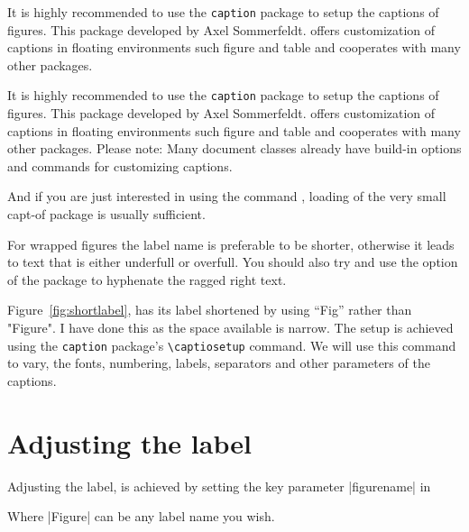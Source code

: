 It is highly recommended to use the \texttt{caption} package to setup the captions of figures. This package developed by Axel Sommerfeldt. offers customization of captions in floating environments such
figure and table and cooperates with many other packages.

It is highly recommended to use the \texttt{caption} package to setup the captions of figures. This package developed by Axel Sommerfeldt. offers customization of captions in floating environments such
figure and table and cooperates with many other packages.
Please note: Many document classes already have build-in options and commands
for customizing captions.

And if you are just interested in using the
command , loading of the very small capt-of package is usually sufficient.

For wrapped figures the label name is preferable to be shorter, otherwise it leads to text that is either underfull or overfull. You should also try and use the  option of the  package to hyphenate the ragged right text.



Figure~\ref{fig:shortlabel}, has its label shortened by using ``Fig'' rather than "Figure". I have done this as the space available is narrow. The setup is achieved using the \texttt{caption} package's \verb+\captiosetup+ command. We will use this command to vary, the fonts, numbering, labels, separators and other parameters of the captions.

\section{Adjusting the label\hfill\hfill}%

Adjusting the label, is achieved by setting the key parameter |figurename| in  

\begin{Code}
\captionsetup{figurename=Figure}
\end{Code}


Where |Figure| can be any label name you wish.

